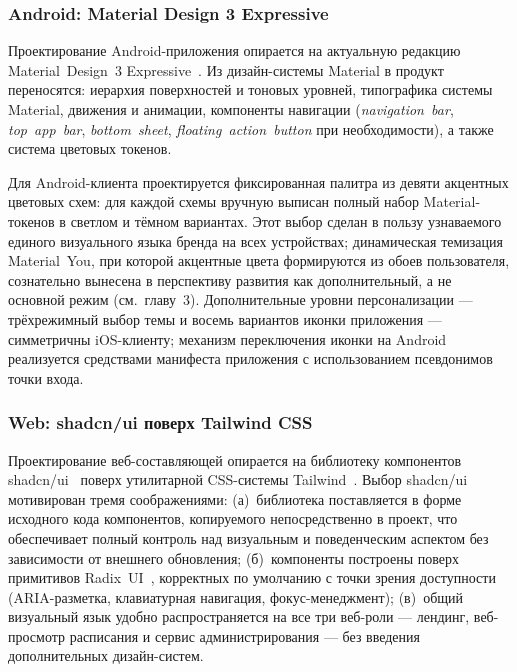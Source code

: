 \subsubsection{Android: Material Design 3 Expressive}
\label{subsubsec:design-android}

Проектирование Android-приложения опирается на актуальную редакцию Material~Design~3 Expressive~\cite{material-design-3}. Из дизайн-системы Material в продукт переносятся: иерархия поверхностей и тоновых уровней, типографика системы Material, движения и анимации, компоненты навигации (\emph{navigation~bar}, \emph{top~app~bar}, \emph{bottom~sheet}, \emph{floating~action~button} при необходимости), а также система цветовых токенов.

Для Android-клиента проектируется фиксированная палитра из девяти акцентных цветовых схем: для каждой схемы вручную выписан полный набор Material-токенов в светлом и тёмном вариантах. Этот выбор сделан в пользу узнаваемого единого визуального языка бренда на всех устройствах; динамическая темизация Material~You, при которой акцентные цвета формируются из обоев пользователя, сознательно вынесена в перспективу развития как дополнительный, а не основной режим (см.~главу~3). Дополнительные уровни персонализации --- трёхрежимный выбор темы и восемь вариантов иконки приложения --- симметричны iOS-клиенту; механизм переключения иконки на Android реализуется средствами манифеста приложения с использованием псевдонимов точки входа.

\subsubsection{Web: shadcn/ui поверх Tailwind CSS}
\label{subsubsec:design-web}

Проектирование веб-составляющей опирается на библиотеку компонентов shadcn/ui~\cite{shadcn-ui} поверх утилитарной CSS-системы Tailwind~\cite{tailwind-css}. Выбор shadcn/ui мотивирован тремя соображениями: (а)~библиотека поставляется в форме исходного кода компонентов, копируемого непосредственно в проект, что обеспечивает полный контроль над визуальным и поведенческим аспектом без зависимости от внешнего обновления; (б)~компоненты построены поверх примитивов Radix~UI~\cite{radix-ui}, корректных по умолчанию с точки зрения доступности (ARIA-разметка, клавиатурная навигация, фокус-менеджмент); (в)~общий визуальный язык удобно распространяется на все три веб-роли --- лендинг, веб-просмотр расписания и сервис администрирования --- без введения дополнительных дизайн-систем.

